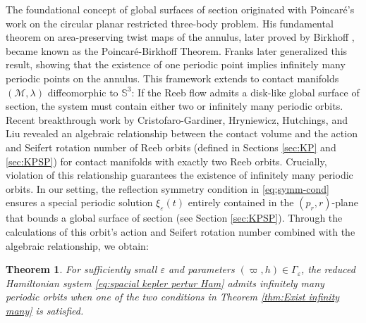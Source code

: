 \documentclass[11pt]{amsart}
\newcommand{\ep}{\varepsilon}
\newcommand{\om}{\varpi}
\newtheorem{thm}{Theorem}[section]
\begin{document}
The foundational concept of global surfaces of section originated with Poincaré's work \cite{Pc12} on the circular planar restricted three-body problem. His fundamental theorem on area-preserving twist maps of the annulus, later proved by Birkhoff \cite{Bk13}, became known as the Poincaré-Birkhoff Theorem. Franks \cite{Franks92} later generalized this result, showing that the existence of one periodic point implies infinitely many periodic points on the annulus. This framework extends to contact manifolds $(\mathcal{M},\lambda)$ diffeomorphic to $\mathbb{S}^{3}$: If the Reeb flow admits a disk-like global surface of section, the system must contain either two or infinitely many periodic orbits. Recent breakthrough work by Cristofaro-Gardiner, Hryniewicz, Hutchings, and Liu \cite{CHHL23} revealed an algebraic relationship between the contact volume and the action and Seifert rotation number of Reeb orbits (defined in Sections \ref{sec:KP} and \ref{sec:KPSP}) for contact manifolds with exactly two Reeb orbits. Crucially, violation of this relationship guarantees the existence of infinitely many periodic orbits. In our setting, the reflection symmetry condition in \eqref{eq;symm-cond} ensures a special periodic solution $\xi_{\ep}(t)$ entirely contained in the $(p_r, r)$-plane that bounds a global surface of section (see Section \ref{sec:KPSP}). Through the calculations of this orbit's action and Seifert rotation number combined with the algebraic relationship, we obtain:
\begin{thm}\label{thm;Exist infinity many 1}
For sufficiently small $\ep$ and parameters $(\om,h) \in \Gamma_\ep$, the reduced Hamiltonian system \eqref{eq:spacial kepler pertur Ham} admits infinitely many periodic orbits when one of the two conditions in Theorem \ref{thm:Exist infinity many} is satisfied. 
\end{thm}
\end{document}
